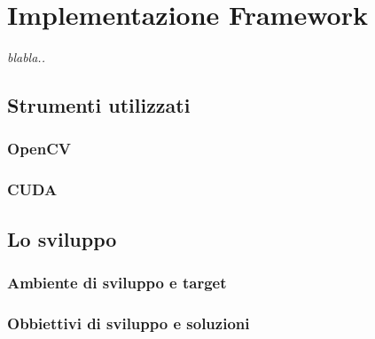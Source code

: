 \chapter{Implementazione Framework}
\label{chap:impl}

\begin{minipage}{12cm}\textit{blabla..}
\end{minipage}

\vspace*{1cm}

\section{Strumenti utilizzati}
\label{sec:tools}


\subsection{OpenCV}
\label{sec:tools:opencv}

\subsection{CUDA}
\label{sec:tools:cuda}



\section{Lo sviluppo}
\label{sec:sviluppo}

\subsection{Ambiente di sviluppo e target}
\label{sec:dev:ambiente}

\subsection{Obbiettivi di sviluppo e soluzioni}
\label{sec:dev:obj}


